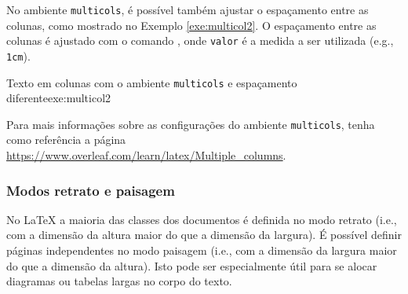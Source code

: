 No ambiente {\tt multicols}, é possível também ajustar o espaçamento entre as colunas, como mostrado no Exemplo \ref{exe:multicol2}. O espaçamento entre as colunas é ajustado com o comando \texttt{\setlength{\columnsep}{valor}}, onde {\tt valor} é a medida a ser utilizada (e.g., {\tt 1cm}).

\begin{texexptitled}[breakable,enhanced,middle=2mm]{Texto em colunas com o ambiente {\tt multicols} e espaçamento diferente}{exe:multicol2}
\lipsumsentence[1-2]
\setlength{\columnsep}{2cm}
\begin{multicols}{3}
    \lipsum[3]
\end{multicols}
\lipsumsentence[5-6]
\end{texexptitled}

%

\begin{marker}
Para mais informações sobre as configurações do ambiente {\tt multicols}, tenha como referência a página \url{https://www.overleaf.com/learn/latex/Multiple_columns}.
\end{marker}

\subsubsection*{Modos retrato e paisagem}
\label{sec:retratopaisagem}

No \LaTeX{} a maioria das classes dos documentos é definida no modo retrato (i.e., com a dimensão da altura maior do que a dimensão da largura). É possível definir páginas independentes no modo paisagem (i.e., com a dimensão da largura maior do que a dimensão da altura). Isto pode ser especialmente útil para se alocar diagramas ou tabelas largas no corpo do texto.

